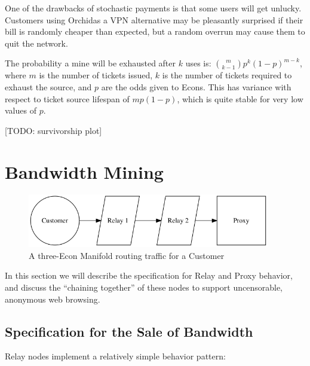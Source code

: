 \documentclass{article}
\newcommand{\orchid}{Orchid}
\newcommand{\Orchid}{\orchid}
\begin{document}
One of the drawbacks of stochastic payments is that some users will
get unlucky. Customers using \Orchid as a VPN alternative may be
pleasantly surprised if their bill is randomly cheaper than expected,
but a random overrun may cause them to quit the network.

The probability a mine will be exhausted after $k$ uses is:
$\binom{m}{k-1} p^{k} (1-p)^{m-k}$, where $m$ is the number of tickets
issued, $k$ is the number of tickets required to exhaust the source,
and $p$ are the odds given to Econs. This has variance with respect to
ticket source lifespan of $m p (1-p)$, which is quite stable for very
low values of $p$.

[TODO: survivorship plot]

\section{Bandwidth Mining}
\label{sec:mining}

\begin{figure}[htbp]
  \centering
  \includegraphics[width = 300pt]{sttc}
  \caption{A three-Econ Manifold routing traffic for a Customer}
\end{figure}

In this section we will describe the specification for Relay and Proxy
behavior, and discuss the ``chaining together'' of these nodes to
support uncensorable, anonymous web browsing.

\subsection{Specification for the Sale of Bandwidth}

Relay nodes implement a relatively simple behavior pattern:
\end{document}
